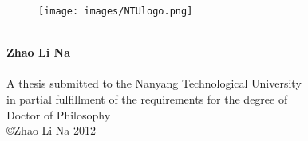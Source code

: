 \begin{titlepage}
\begin{center}

\begin{figure}[H]
    \texttt{[image: images/NTUlogo.png]}
\end{figure}

\vspace*{1.8cm}
 \\
\vspace*{1.5cm}
\noindent \large \textbf{Zhao Li Na} \\
\vspace*{5.5cm}
\vspace*{0.3cm}
 \\

\vspace*{2.0cm}
A thesis submitted to the Nanyang Technological University \\
in partial fulfillment of the requirements for the degree of \\
Doctor of Philosophy \\
\vspace*{0.5cm}
\copyright Zhao Li Na 2012
\end{center}

\end{titlepage}
\sloppy

\titlepage
